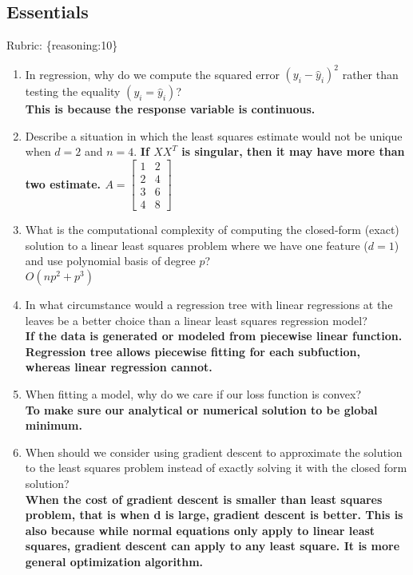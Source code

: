 \documentclass{article}
\def\rubric#1{\gre{Rubric: \{#1\}}}{}
\def\gre#1{{\color{gre}#1}}
\def\enum#1{\begin{enumerate}#1\end{enumerate}}
\begin{document}
\subsection{Essentials}
\rubric{reasoning:10}

\enum{
\item In regression, why do we compute the squared error $(y_i - \hat{y}_i)^2$ rather than testing the equality $(y_i = \hat{y}_i)$?\\
\textbf{This is because the response variable is continuous. }
\item Describe a situation in which the least squares estimate would not be unique when $d=2$ and $n=4$. 
\textbf{If $XX^T$ is singular, then it may have more than two estimate.
$A = \left[\begin{array}{ccc}
1 & 2\\
2 & 4\\
3 & 6\\
4&8
\end{array}\right]$\\}
\item What is the computational complexity of computing the closed-form (exact) solution to a linear least squares problem where we have one feature ($d = 1$) and use polynomial basis of degree $p$?\\
\textbf{$O(np^2+p^3)$}
\item In what circumstance would a regression tree with linear regressions at the leaves be a better choice
than a linear least squares regression model?\\
\textbf{If the data is generated or modeled  from piecewise linear function. Regression tree allows piecewise fitting for each subfuction, whereas linear regression cannot.}\\
\item When fitting a model, why do we care if our loss function is convex?\\
\textbf{To make sure our analytical or numerical solution to be global minimum.}\\
\item When should we consider using gradient descent to approximate the solution to the least squares problem instead of exactly solving it with the closed form solution?\\
\textbf{When the cost of gradient descent is smaller than least squares problem, that is when d is large, gradient descent is better. This is also because while normal equations only apply to linear least squares, gradient descent can apply to any least square. It is more general optimization algorithm.}\\
}
\end{document}
